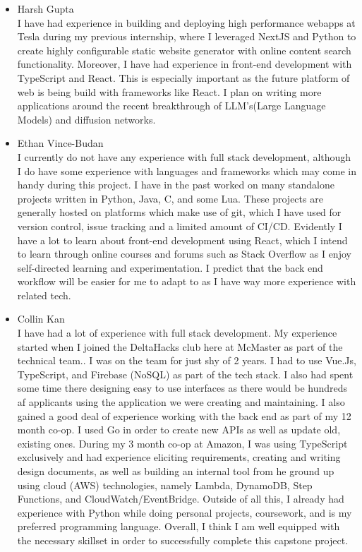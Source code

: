 \documentclass[12pt]{article}
\begin{document}
\begin{itemize}
    \item Harsh Gupta \\
        I have had experience in building and deploying high performance webapps at Tesla during my previous internship, where I leveraged NextJS and Python to create highly configurable static website generator with online content search functionality. Moreover, I have had experience in front-end development with TypeScript and React. This is especially important as the future platform of web is being build with frameworks like React. I plan on writing more applications around the recent breakthrough of LLM's(Large Language Models) and diffusion networks.

    \item Ethan Vince-Budan \\
        I currently do not have any experience with full stack development, although I do have some experience with languages and frameworks which may come in handy during this project. I have in the past worked on many standalone projects written in Python, Java, C, and some Lua. These projects are generally hosted on platforms which make use of git, which I have used for version control, issue tracking and a limited amount of CI/CD. Evidently I have a lot to learn about front-end development using React, which I intend to learn through online courses and forums such as Stack Overflow as I enjoy self-directed learning and experimentation. I predict that the back end workflow will be easier for me to adapt to as I have way more experience with related tech.

    \item Collin Kan \\
        I have had a lot of experience with full stack development. My experience started when I joined the DeltaHacks club here at McMaster as part of the technical team.. I was on the team for just shy of 2 years. I had to use Vue.Js, TypeScript, and Firebase (NoSQL) as part of the tech stack. I also had spent some time there designing easy to use interfaces as there would be hundreds af applicants using the application we were creating and maintaining. I also gained a good deal of experience working with the back end as part of my 12 month co-op. I used Go in order to create new APIs as well as update old, existing ones. During my 3 month co-op at Amazon, I was using TypeScript exclusively and had experience eliciting requirements, creating and writing design documents, as well as building an internal tool from he ground up using cloud (AWS) technologies, namely Lambda, DynamoDB, Step Functions, and CloudWatch/EventBridge. Outside of all this, I already had experience with Python while doing personal projects, coursework, and is my preferred programming language. Overall, I think I am well equipped with the necessary skillset in order to successfully complete this capstone project.
\end{itemize}
\end{document}

